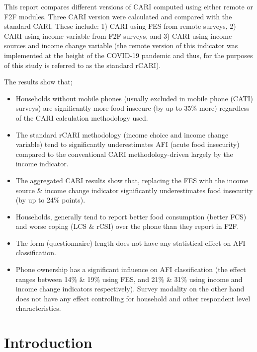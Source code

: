 \documentclass[11pt,harvard]{article}
\begin{document}
This report compares different versions of CARI computed using either remote or F2F modules. Three CARI version were calculated and compared with the standard CARI. These include: 1) CARI using FES from remote surveys, 2) CARI using income variable from F2F surveys, and 3) CARI using income sources and income change variable (the remote version of this indicator was implemented at the height of the COVID-19 pandemic and thus, for the purposes of this study is referred to as the standard rCARI). 

The results show that; 
\begin{itemize}
	\item Households without mobile phones (usually excluded in mobile phone (CATI) surveys) are significantly more food insecure (by up to 35\% more) regardless of the CARI calculation methodology used. 
	\item The standard rCARI methodology (income choice and income change variable) tend to significantly underestimates AFI (acute food insecurity) compared to the conventional CARI methodology-driven largely by the income indicator.
	\item The aggregated CARI results show that, replacing the FES with the income source \& income change indicator significantly underestimates food insecurity (by up to 24\% points).
	\item Households, generally tend to report better food consumption (better FCS) and worse coping (LCS \& rCSI) over the phone than they report in F2F.
	\item The form (questionnaire) length does not have any statistical effect on AFI classification.
	\item Phone ownership has a significant influence on AFI classification (the effect ranges between 14\% \& 19\% using FES, and 21\% \& 31\% using income and income change indicators respectively). Survey modality on the other hand does not have any effect controlling for household and other respondent level characteristics.
\end{itemize}

\pagebreak

\section{Introduction}
\end{document}
